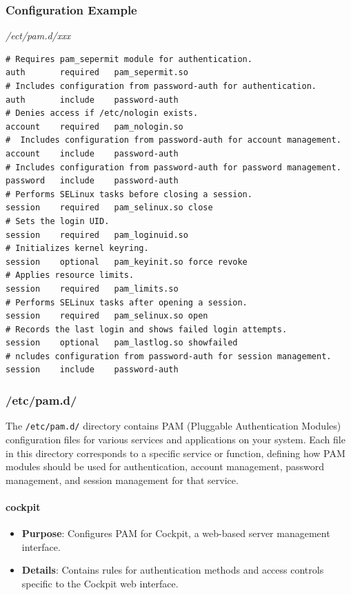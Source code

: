 \documentclass{article}
\newenvironment{codetemplate}[1][]{%
  \mybasecolorbox[#1]
  \itshape
}{%
  \endmybasecolorbox
}
\begin{document}
\subsubsection{Configuration Example}
\begin{codetemplate}{/ect/pam.d/xxx}
\begin{verbatim}
# Requires pam_sepermit module for authentication.
auth       required   pam_sepermit.so
# Includes configuration from password-auth for authentication.
auth       include    password-auth
# Denies access if /etc/nologin exists.
account    required   pam_nologin.so
#  Includes configuration from password-auth for account management.
account    include    password-auth
# Includes configuration from password-auth for password management.
password   include    password-auth
# Performs SELinux tasks before closing a session.
session    required   pam_selinux.so close
# Sets the login UID.
session    required   pam_loginuid.so
# Initializes kernel keyring.
session    optional   pam_keyinit.so force revoke
# Applies resource limits.
session    required   pam_limits.so
# Performs SELinux tasks after opening a session.
session    required   pam_selinux.so open
# Records the last login and shows failed login attempts.
session    optional   pam_lastlog.so showfailed
# ncludes configuration from password-auth for session management.
session    include    password-auth    
\end{verbatim}
\end{codetemplate}

\subsubsection{/etc/pam.d/}
The \verb|/etc/pam.d/| directory contains PAM (Pluggable Authentication Modules) configuration files for various services and applications on your system. Each file in this directory corresponds to a specific service or function, defining how PAM modules should be used for authentication, account management, password management, and session management for that service.

\paragraph{cockpit}

\begin{itemize}
    \item \textbf{Purpose}: Configures PAM for Cockpit, a web-based server management interface.
    \item \textbf{Details}: Contains rules for authentication methods and access controls specific to the Cockpit web interface.
\end{itemize}
\end{document}
